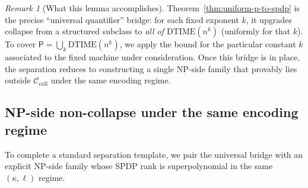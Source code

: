 \documentclass[12pt]{article}
\theoremstyle{definition}
\theoremstyle{definition}
\theoremstyle{remark}
\newtheorem{remark}{Remark}
\theoremstyle{remark}
\begin{document}
\begin{remark}[What this lemma accomplishes]
Theorem~\ref{thm:uniform-p-to-spdp} is the precise ``universal quantifier'' bridge:
for each fixed exponent $k$, it upgrades collapse from a structured subclass to \emph{all of $\mathrm{DTIME}(n^k)$} (uniformly for that $k$). To cover $\mathsf{P}=\bigcup_k\mathrm{DTIME}(n^k)$, we apply the bound for the particular constant $k$ associated to the fixed machine under consideration.
Once this bridge is in place, the separation reduces to constructing a single
NP-side family that provably lies outside $\mathcal{C}_{\mathrm{coll}}$ under the
same encoding regime.
\end{remark}

\subsection{NP-side non-collapse under the same encoding regime}
\label{subsec:np-side-noncollapse}

To complete a standard separation template, we pair the universal bridge with an
explicit NP-side family whose SPDP rank is superpolynomial in the same
$(\kappa,\ell)$ regime.
\end{document}
